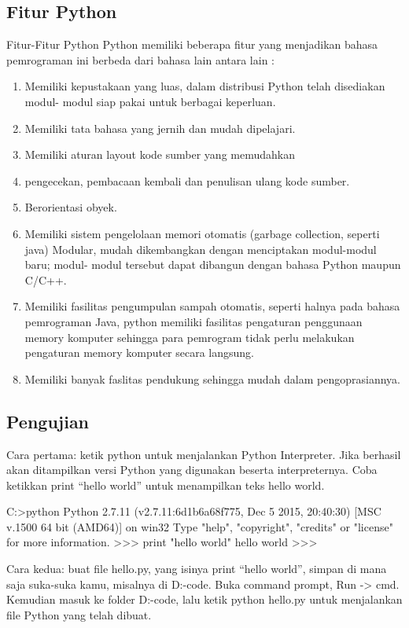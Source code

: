 \subsection{Fitur Python}
Fitur-Fitur Python Python memiliki beberapa fitur yang menjadikan bahasa pemrograman ini berbeda dari bahasa lain antara lain :
\begin{enumerate}
\item Memiliki kepustakaan yang luas, dalam distribusi Python telah disediakan modul- modul siap pakai untuk berbagai keperluan.
\item Memiliki tata bahasa yang jernih dan mudah dipelajari.
\item Memiliki aturan layout kode sumber yang memudahkan
\item pengecekan, pembacaan kembali dan penulisan ulang kode sumber.
\item Berorientasi obyek.
\item Memiliki sistem pengelolaan memori otomatis (garbage collection, seperti java) Modular, mudah dikembangkan dengan menciptakan modul-modul baru; modul- modul tersebut dapat dibangun dengan bahasa Python maupun C/C++.
\item Memiliki fasilitas pengumpulan sampah otomatis, seperti halnya pada bahasa pemrograman Java, python memiliki fasilitas pengaturan penggunaan memory komputer sehingga para pemrogram tidak perlu melakukan pengaturan memory komputer secara langsung.
\item Memiliki banyak faslitas pendukung sehingga mudah dalam pengoprasiannya.
\end{enumerate}

\subsection{Pengujian}
Cara pertama: ketik python untuk menjalankan Python Interpreter. Jika berhasil akan ditampilkan versi Python yang digunakan beserta interpreternya. Coba ketikkan print “hello world” untuk menampilkan teks hello world.

C:>python
Python 2.7.11 (v2.7.11:6d1b6a68f775, Dec  5 2015, 20:40:30) [MSC v.1500 64 bit (AMD64)] on win32
Type "help", "copyright", "credits" or "license" for more information.
>>> print "hello world"
hello world
>>>

Cara kedua: buat file hello.py, yang isinya print “hello world”, simpan di mana saja suka-suka kamu, misalnya di D:\python-code. Buka command prompt, Run -> cmd. Kemudian masuk ke folder D:\python-code, lalu ketik python hello.py untuk menjalankan file Python yang telah dibuat.

